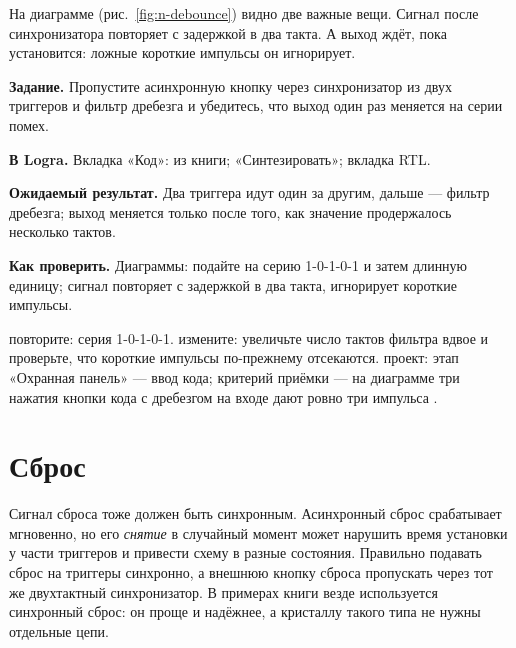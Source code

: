 
На диаграмме (рис.~\ref{fig:n-debounce}) видно две важные вещи. Сигнал  после
синхронизатора повторяет  с задержкой в два такта. А выход
 ждёт, пока  установится: ложные короткие импульсы он
игнорирует.

\begin{diybox}
\textbf{Задание.} Пропустите асинхронную кнопку через синхронизатор из двух триггеров и фильтр дребезга и убедитесь, что выход один раз меняется на серии помех.

\textbf{В Logra.} Вкладка «Код»:  из книги; «Синтезировать»; вкладка RTL.

\textbf{Ожидаемый результат.} Два триггера идут один за другим, дальше --- фильтр дребезга; выход  меняется только после того, как значение продержалось несколько тактов.

\textbf{Как проверить.} Диаграммы: подайте на  серию 1-0-1-0-1 и затем длинную единицу; сигнал  повторяет  с задержкой в два такта,  игнорирует короткие импульсы.

 повторите: серия 1-0-1-0-1.  измените: увеличьте число тактов фильтра вдвое и проверьте, что короткие импульсы по-прежнему отсекаются.  проект: этап «Охранная панель» --- ввод кода; критерий приёмки --- на диаграмме три нажатия кнопки кода с дребезгом на входе дают ровно три импульса .
\end{diybox}

\section{Сброс}

Сигнал сброса тоже должен быть синхронным. Асинхронный сброс срабатывает
мгновенно, но его \emph{снятие} в случайный момент может нарушить время
установки у части триггеров и привести схему в разные состояния. Правильно
подавать сброс на триггеры синхронно, а внешнюю кнопку сброса пропускать
через тот же двухтактный синхронизатор. В примерах книги везде используется
синхронный сброс: он проще и надёжнее, а кристаллу такого типа не нужны
отдельные цепи.

